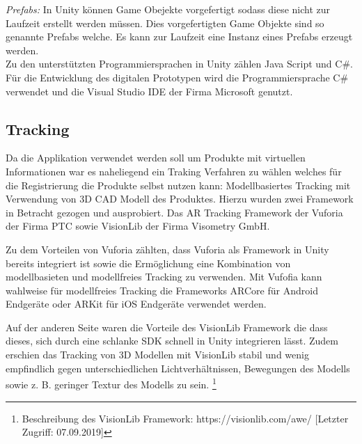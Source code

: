\textit{Prefabs:} In Unity können Game Obejekte vorgefertigt sodass diese nicht zur Laufzeit erstellt werden müssen. Dies vorgefertigten Game Objekte sind so genannte Prefabs welche. Es kann zur Laufzeit eine Instanz eines Prefabs erzeugt werden.\cite{Unity}\\

Zu den unterstützten Programmiersprachen in Unity zählen Java Script und C\#. Für die Entwicklung des digitalen Prototypen wird die Programmiersprache C\# verwendet und die Visual Studio IDE der Firma Microsoft genutzt. 

\subsection{Tracking}


Da die Applikation verwendet werden soll um Produkte mit virtuellen Informationen war es naheliegend ein Traking Verfahren zu wählen welches für die Registrierung die Produkte selbst nutzen kann: Modellbasiertes Tracking mit Verwendung von 3D CAD Modell des Produktes. 
Hierzu wurden zwei Framework in Betracht gezogen und ausprobiert. Das AR Tracking Framework der Vuforia der Firma PTC sowie VisionLib der Firma Visometry GmbH. 

Zu dem Vorteilen von Vuforia zählten, dass Vuforia als Framework in Unity bereits integriert ist sowie die Ermöglichung eine Kombination von modellbasieten und modellfreies Tracking zu verwenden. 
Mit Vufofia kann wahlweise für modellfreies Tracking die Frameworks ARCore für Android Endgeräte oder ARKit für iOS Endgeräte verwendet werden. 

Auf der anderen Seite waren die Vorteile des VisionLib Framework die dass dieses, sich durch eine schlanke SDK schnell in Unity integrieren lässt. Zudem erschien das Tracking von 3D Modellen mit VisionLib stabil und wenig empfindlich gegen 
unterschiedlichen Lichtverhältnissen, Bewegungen des Modells sowie z. B. geringer Textur des Modells zu sein. \footnote{Beschreibung des VisionLib Framework: https://visionlib.com/awe/ [Letzter Zugriff: 07.09.2019]}

